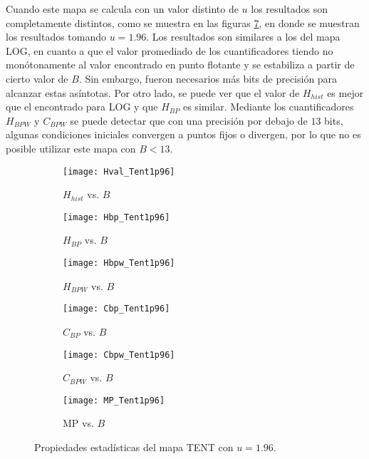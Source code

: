 Cuando este mapa se calcula con un valor distinto de $u$ los resultados son completamente distintos, como se muestra en las figuras \ref{fig:TENT1p96_QuantiB}, en donde se muestran los resultados tomando $u=1.96$.
Los resultados son similares a los del mapa LOG, en cuanto a que el valor promediado de los cuantificadores tiendo no monótonamente al valor encontrado en punto flotante y se estabiliza a partir de cierto valor de $B$.
Sin embargo, fueron necesarios más bits de precisión para alcanzar estas asíntotas.
Por otro lado, se puede ver que el valor de $H_{hist}$ es mejor que el encontrado para LOG y que $H_{BP}$ es similar.
Mediante los cuantificadores $H_{BPW}$ y $C_{BPW}$ se puede detectar que con una precisión por debajo de $13$ bits, algunas condiciones iniciales convergen a puntos fijos o divergen, por lo que no es posible utilizar este mapa con $B < 13$.
%
\begin{figure}[htpb]
	\centering
	\begin{subfigure}[b]{0.49\textwidth}
		\texttt{[image: Hval\_Tent1p96]}
		\caption{$H_{hist}$ vs. $B$}
		\label{fig:Hval_Tent1p96}
	\end{subfigure}
	\begin{subfigure}[b]{0.49\textwidth}
		\texttt{[image: Hbp\_Tent1p96]}
		\caption{$H_{BP}$ vs. $B$}
		\label{fig:Hbp_Tent1p96}
	\end{subfigure}
	\begin{subfigure}[b]{0.49\textwidth}
		\texttt{[image: Hbpw\_Tent1p96]}
		\caption{$H_{BPW}$ vs. $B$}
		\label{fig:Hbpw_Tent1p96}
	\end{subfigure}
	\begin{subfigure}[b]{0.49\textwidth}
		\texttt{[image: Cbp\_Tent1p96]}
		\caption{$C_{BP}$ vs. $B$}
		\label{fig:Cbp_Tent1p96}
	\end{subfigure}
	\begin{subfigure}[b]{0.49\textwidth}
		\texttt{[image: Cbpw\_Tent1p96]}
		\caption{$C_{BPW}$ vs. $B$}
		\label{fig:Cbpw_Tent1p96}
	\end{subfigure}
	\begin{subfigure}[b]{0.49\textwidth}
		\texttt{[image: MP\_Tent1p96]}
		\caption{MP vs. $B$}
		\label{fig:MP_Tent1p96}
	\end{subfigure}
	\caption{Propiedades estadísticas del mapa TENT con $u=1.96$.}
	\label{fig:TENT1p96_QuantiB}
\end{figure}

